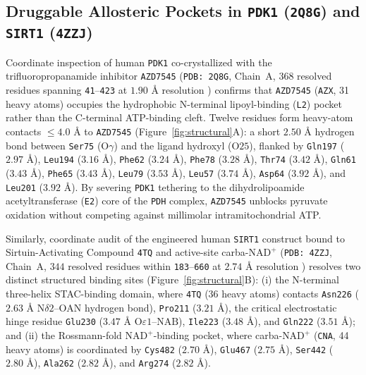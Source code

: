 \documentclass[11pt]{article}
\theoremstyle{plain}
\theoremstyle{remark}
\begin{document}
\subsection{Druggable Allosteric Pockets in \texttt{PDK1} (\texttt{2Q8G}) and \texttt{SIRT1} (\texttt{4ZZJ})}
Coordinate inspection of human \texttt{PDK1} co-crystallized with the trifluoropropanamide inhibitor \texttt{AZD7545} (\texttt{PDB: 2Q8G}, Chain~A, $368$ resolved residues spanning \texttt{41}--\texttt{423} at $1.90\text{ \AA}$ resolution \cite{kato2007pdk1}) confirms that \texttt{AZD7545} (\texttt{AZX}, 31 heavy atoms) occupies the hydrophobic N-terminal lipoyl-binding (\texttt{L2}) pocket rather than the C-terminal ATP-binding cleft. Twelve residues form heavy-atom contacts $\le 4.0\text{ \AA}$ to \texttt{AZD7545} (Figure~\ref{fig:structural}A): a short $2.50\text{ \AA}$ hydrogen bond between \texttt{Ser75} ($\text{O}\gamma$) and the ligand hydroxyl ($\text{O25}$), flanked by \texttt{Gln197} ($2.97\text{ \AA}$), \texttt{Leu194} ($3.16\text{ \AA}$), \texttt{Phe62} ($3.24\text{ \AA}$), \texttt{Phe78} ($3.28\text{ \AA}$), \texttt{Thr74} ($3.42\text{ \AA}$), \texttt{Gln61} ($3.43\text{ \AA}$), \texttt{Phe65} ($3.43\text{ \AA}$), \texttt{Leu79} ($3.53\text{ \AA}$), \texttt{Leu57} ($3.74\text{ \AA}$), \texttt{Asp64} ($3.92\text{ \AA}$), and \texttt{Leu201} ($3.92\text{ \AA}$). By severing \texttt{PDK1} tethering to the dihydrolipoamide acetyltransferase (\texttt{E2}) core of the \texttt{PDH} complex, \texttt{AZD7545} unblocks pyruvate oxidation without competing against millimolar intramitochondrial ATP.

Similarly, coordinate audit of the engineered human \texttt{SIRT1} construct bound to Sirtuin-Activating Compound \texttt{4TQ} and active-site carba-$\text{NAD}^+$ (\texttt{PDB: 4ZZJ}, Chain~A, $344$ resolved residues within \texttt{183}--\texttt{660} at $2.74\text{ \AA}$ resolution \cite{dai2015sirt1}) resolves two distinct structured binding sites (Figure~\ref{fig:structural}B): (i) the N-terminal three-helix STAC-binding domain, where \texttt{4TQ} (36 heavy atoms) contacts \texttt{Asn226} ($2.63\text{ \AA}$ $\text{N}\delta2\text{--OAN}$ hydrogen bond), \texttt{Pro211} ($3.21\text{ \AA}$), the critical electrostatic hinge residue \texttt{Glu230} ($3.47\text{ \AA}$ $\text{O}\varepsilon1\text{--NAB}$), \texttt{Ile223} ($3.48\text{ \AA}$), and \texttt{Gln222} ($3.51\text{ \AA}$); and (ii) the Rossmann-fold $\text{NAD}^+$-binding pocket, where carba-$\text{NAD}^+$ (\texttt{CNA}, 44 heavy atoms) is coordinated by \texttt{Cys482} ($2.70\text{ \AA}$), \texttt{Glu467} ($2.75\text{ \AA}$), \texttt{Ser442} ($2.80\text{ \AA}$), \texttt{Ala262} ($2.82\text{ \AA}$), and \texttt{Arg274} ($2.82\text{ \AA}$).
\end{document}

